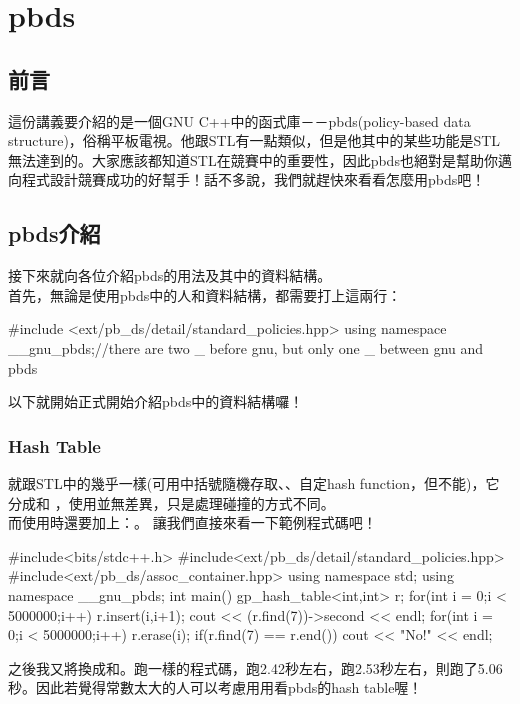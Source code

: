 \chapter{pbds}
\section{前言}
這份講義要介紹的是一個GNU C++中的函式庫－－pbds(policy-based data structure)，俗稱平板電視。他跟STL有一點類似，但是他其中的某些功能是STL無法達到的。大家應該都知道STL在競賽中的重要性，因此pbds也絕對是幫助你邁向程式設計競賽成功的好幫手！話不多說，我們就趕快來看看怎麼用pbds吧！
\section{pbds介紹}
接下來就向各位介紹pbds的用法及其中的資料結構。\\
首先，無論是使用pbds中的人和資料結構，都需要打上這兩行：\\
\begin{C++}
#include <ext/pb_ds/detail/standard_policies.hpp>
using namespace __gnu_pbds;//there are two _ before gnu, but only one _ between gnu and pbds
\end{C++}

以下就開始正式開始介紹pbds中的資料結構囉！
\subsection{Hash Table}
就跟STL中的幾乎一樣(可用中括號隨機存取、、自定hash function，但不能)，它分成和 ，使用並無差異，只是處理碰撞的方式不同。\\
而使用時還要加上：。
讓我們直接來看一下範例程式碼吧！\\
\begin{C++}
#include<bits/stdc++.h>
#include<ext/pb_ds/detail/standard_policies.hpp>
#include<ext/pb_ds/assoc_container.hpp>
using namespace std;
using namespace __gnu_pbds;
int main()
{
  gp_hash_table<int,int> r;
  for(int i = 0;i < 5000000;i++)
  {
    r.insert({i,i+1});
  }
  cout << (r.find(7))->second << endl;
  for(int i = 0;i < 5000000;i++)
  {
    r.erase(i);
  }
  if(r.find(7) == r.end())
  {
    cout << "No!" << endl;
  }
}
\end{C++}

之後我又將換成和。跑一樣的程式碼，跑2.42秒左右，跑2.53秒左右，則跑了5.06秒。因此若覺得常數太大的人可以考慮用用看pbds的hash table喔！

